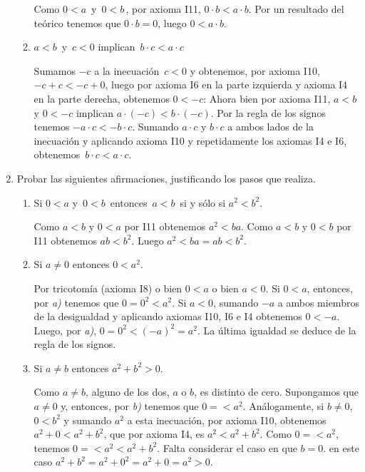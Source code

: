 \begin{enumerate}
\begin{enumerate}
        \rta Como $0<a\,$ y $\,0<b\,$, por axioma I11, $0 \cdot b < a \cdot b$. Por un resultado del teórico  tenemos que $0 \cdot b = 0$, luego $0 < a\cdot b$.
        
        \item $a<b\,$ y $\,c<0$ implican $\,b\cdot c<a\cdot c$
        
        \rta Sumamos $-c$  a la inecuación  $\,c<0$ y  obtenemos, por axioma I10,    $-c + c<-c + 0$, luego por axioma I6 en la parte izquierda y axioma I4 en la parte derecha, obtenemos $0 < -c$: Ahora bien  por axioma I11, $a<b\,$ y  $0 < -c$ implican $a \cdot (-c)<b \cdot (-c)$. Por la regla de los signos tenemos $-a \cdot c<- b \cdot c$. Sumando $a \cdot c$ y $ b \cdot c$  a ambos lados de la inecuación y aplicando axioma I10 y  repetidamente los axiomas I4 e I6, obtenemos  $\,b\cdot c<a\cdot c$.
    \end{enumerate}
    

    \item  Probar las siguientes afirmaciones, justificando los pasos que realiza.
    \begin{enumerate}
        \item Si $0 < a$  y $\,0<b\,$ entonces $\,a<b\,$ si y sólo si $a^2<b^2$.
        
        \rta  Como $a < b$ y $0 < a$ por I11 obtenemos $a^2 < ba$. Como $a < b$ y $0 < b$ por I11 obtenemos $ab < b^2$. Luego  $a^2 < ba = ab < b^2$.
        
        
        \item Si $a\neq 0$  entonces $0 < a^2$.
        
        \rta  Por tricotomía (axioma I8) o bien $0 <a$ o bien $a <0$. Si $0<a$, entonces, por \textit{a)} tenemos que $0 = 0^2 < a^2$.  Si $a<0$, sumando $-a$ a ambos miembros de la desigualdad y aplicando axiomas I10, I6 e I4 obtenemos $0 < -a$. Luego, por \textit{a)},  $0 = 0^2 < (-a)^2 = a^2$. La última igualdad se deduce de la regla de los signos. 
        
        \item Si $a\neq b$  entonces $a^2+b^2>0$.
        
        \rta Como $a\neq b$,  alguno de los dos, $a$ o $b$, es distinto de cero. Supongamos que $a \ne 0$ y, entonces, por  \textit{b)} tenemos que $0 = < a^2$. Análogamente, si $b \ne 0$, $0 < b^2$ y sumando  $a^2$  a esta inecuación, por axioma I10, obtenemos $a^2 + 0 <a^2 + b^2$, que por axioma I4, es $a^2  <a^2 + b^2$. Como $0 = < a^2$, tenemos $0 = < a^2 < a^2 + b^2$. Falta considerar el caso en que  $b =0$. en este caso $a^2 + b^2 = a^2 + 0^2 = a^2 + 0 = a^2 > 0$.
        

\end{enumerate}
\end{enumerate}
